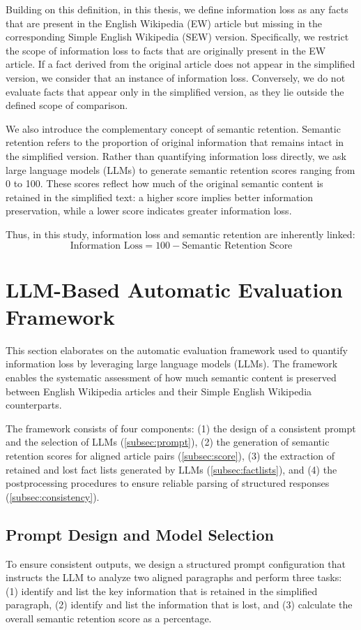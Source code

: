 \documentclass{DESSThesis}
\begin{document}
Building on this definition, in this thesis, we define information loss as any facts that are present in the English Wikipedia (EW) article but missing in the corresponding Simple English Wikipedia (SEW) version. Specifically, we restrict the scope of information loss to facts that are originally present in the EW article. If a fact derived from the original article does not appear in the simplified version, we consider that an instance of information loss. Conversely, we do not evaluate facts that appear only in the simplified version, as they lie outside the defined scope of comparison. 

We also introduce the complementary concept of semantic retention. Semantic retention refers to the proportion of original information that remains intact in the simplified version. Rather than quantifying information loss directly, we ask large language models (LLMs) to generate semantic retention scores ranging from 0 to 100. These scores reflect how much of the original semantic content is retained in the simplified text: a higher score implies better information preservation, while a lower score indicates greater information loss. 

Thus, in this study, information loss and semantic retention are inherently linked:
\[
\text{Information Loss} = 100 - \text{Semantic Retention Score}
\]

\section{LLM-Based Automatic Evaluation Framework}

This section elaborates on the automatic evaluation framework used to quantify information loss by leveraging large language models (LLMs). The framework enables the systematic assessment of how much semantic content is preserved between English Wikipedia articles and their Simple English Wikipedia counterparts. 

The framework consists of four components:  
(1) the design of a consistent prompt and the selection of LLMs (\autoref{subsec:prompt}), 
(2) the generation of semantic retention scores for aligned article pairs (\autoref{subsec:score}),  
(3) the extraction of retained and lost fact lists generated by LLMs (\autoref{subsec:factlists}), and
(4) the postprocessing procedures to ensure reliable parsing of structured responses (\autoref{subsec:consistency}).  

\subsection{Prompt Design and Model Selection}
\label{subsec:prompt}
To ensure consistent outputs, we design a structured prompt configuration that instructs the LLM to analyze two aligned paragraphs and perform three tasks:  
(1) identify and list the key information that is retained in the simplified paragraph,  
(2) identify and list the information that is lost, and  
(3) calculate the overall semantic retention score as a percentage.  
\end{document}
